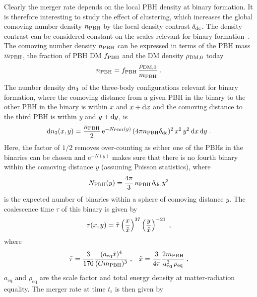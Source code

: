 Clearly the merger rate depends on the local \ac{PBH} density at binary formation. It is therefore interesting to study the effect of clustering, which increases the global comoving number density $n_{\mathrm{PBH}}$ by the  local density contrast $\delta_{\mathrm{dc}}$. The density contrast can be considered constant on the scales relevant for binary formation~\cite{Raidal:2017mfl}. The comoving number density $n_{\mathrm{PBH}}$ can be expressed in terms of the \ac{PBH} mass $m_{\mathrm{PBH}}$, the fraction of \ac{PBH} \ac{DM} $f_{\mathrm{PBH}}$ and the \ac{DM} density $\rho_{\mathrm{DM},0}$ today
\begin{align}
	n_{\mathrm{PBH}} = f_{\mathrm{PBH}} \, \frac{\rho_{\mathrm{DM},0}}{m_{\mathrm{PBH}}}\;.
\end{align}
The number density $\mathrm{d} n_3$ of the three-body configurations relevant for binary formation, where the comoving distance from a given \ac{PBH} in the binary to the other \ac{PBH} in the binary is within $x$ and $x+ \mathrm{d} x$ and the comoving distance to the third \ac{PBH} is within $y$ and $y + \mathrm{d} y$, is~\cite{Raidal:2017mfl}
\begin{align}
	\mathrm{d} n_3 (x, y) = \frac{n_{\mathrm{PBH}}}{2} \, \mathrm{e}^{-N_{\mathrm{PBH}}(y)} \, (4\pi  n_{\mathrm{PBH}}  \delta_{\mathrm{dc}})^2 \, x^2 \, y^2 \, \mathrm{d} x \,  \mathrm{d} y \;. \label{eq:pbh_n3}
\end{align}
Here, the factor of $1/2$ removes over-counting as either one of the \acp{PBH} in the binaries can be chosen and $\mathrm{e}^{-N(y)}$ makes sure that there is no fourth binary within the comoving distance $y$ (assuming Poisson statistics), where
\begin{align}
	N_{\mathrm{PBH}} (y) = \frac{4 \pi}{3} \, n_{\mathrm{PBH}} \, \delta_{\mathrm{dc}} \, y^3
\end{align}
is the expected number of binaries within a sphere of comoving distance $y$. The coalescence time $\tau$ of this binary is given by~\cite{Peters:1964zz,Raidal:2017mfl}
\begin{align}
	\tau (x, y) = \tilde{\tau} \left( \frac{x}{\tilde{x}} \right)^{37} \left( \frac{y}{\tilde{x}} \right)^{-21}\;, 
\end{align}
where
\begin{align}
	\tilde{\tau} = \frac{3}{170} \frac{(a_\mathrm{eq}\tilde{x})^4}{(G m_{\mathrm{PBH}})^3} \; , && 
	\tilde{x} = \frac{3}{4 \pi} \frac{2  m_{\mathrm{PBH}}}{a_\mathrm{eq}^3 \, \rho_\mathrm{eq}}\;,
\end{align}
$a_\mathrm{eq}$ and $\rho_\mathrm{eq}$ are the scale factor and total energy density at matter-radiation equality. The merger rate at time $t_\text{r}$ is then given by
